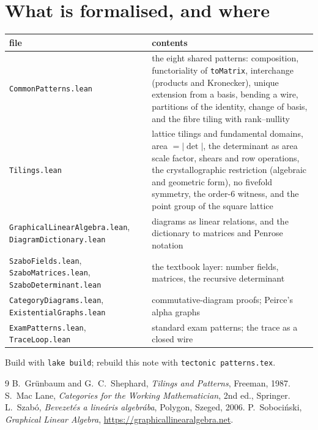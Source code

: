 \documentclass[11pt]{article}
\theoremstyle{definition}
\theoremstyle{plain}
\theoremstyle{remark}
\newcommand{\lean}[1]{\texttt{\small #1}}
\newcommand{\file}[1]{\texttt{\small #1}}
\begin{document}
\section{What is formalised, and where}

\begin{center}\small
\begin{tabular}{@{}p{52mm}p{95mm}@{}}
\toprule
\textbf{file} & \textbf{contents} \\
\midrule
\file{CommonPatterns.lean} & the eight shared patterns: composition, functoriality of
  \lean{toMatrix}, interchange (products and Kronecker), unique extension from a
  basis, bending a wire, partitions of the identity, change of basis, and the
  fibre tiling with rank--nullity \\
\file{Tilings.lean} & lattice tilings and fundamental domains, area
  $=|\det|$, the determinant as area scale factor, shears and row operations,
  the crystallographic restriction (algebraic and geometric form), no fivefold
  symmetry, the order-$6$ witness, and the point group of the square lattice \\
\file{GraphicalLinearAlgebra.lean}, \file{DiagramDictionary.lean} & diagrams as
  linear relations, and the dictionary to matrices and Penrose notation \\
\file{SzaboFields.lean}, \file{SzaboMatrices.lean}, \file{SzaboDeterminant.lean} &
  the textbook layer: number fields, matrices, the recursive determinant \\
\file{CategoryDiagrams.lean}, \file{ExistentialGraphs.lean} & commutative-diagram
  proofs; Peirce's alpha graphs \\
\file{ExamPatterns.lean}, \file{TraceLoop.lean} & standard exam patterns; the
  trace as a closed wire \\
\bottomrule
\end{tabular}
\end{center}

\noindent
Build with \lean{lake build}; rebuild this note with \lean{tectonic patterns.tex}.

\begin{thebibliography}{9}
 B.~Grünbaum and G.~C.~Shephard, \emph{Tilings and Patterns},
  Freeman, 1987.
 S.~Mac Lane, \emph{Categories for the Working Mathematician},
  2nd ed., Springer.
 L.~Szabó, \emph{Bevezetés a lineáris algebrába}, Polygon,
  Szeged, 2006.
 P.~Sobociński, \emph{Graphical Linear Algebra},
  \url{https://graphicallinearalgebra.net}.
\end{thebibliography}
\end{document}
